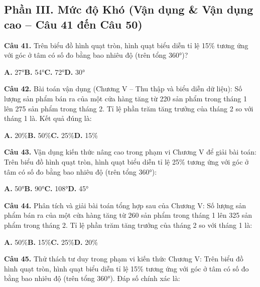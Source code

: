 \documentclass[11pt,a4paper]{article}
\begin{document}
\subsection*{\color{accent} Phần III. Mức độ Khó (Vận dụng \& Vận dụng cao -- Câu 41 đến Câu 50)}
\textbf{\color{primary} Câu 41.} Trên biểu đồ hình quạt tròn, hình quạt biểu diễn tỉ lệ 15\% tương ứng với góc ở tâm có số đo bằng bao nhiêu độ (trên tổng 360°)?\par
\hspace*{1.5em}\textbf{A.} 27°\quad\quad \textbf{B.} 54°\quad\quad \textbf{C.} 72°\quad\quad \textbf{D.} 30°\par\vspace{2pt}
\textbf{\color{primary} Câu 42.} Bài toán vận dụng (Chương V – Thu thập và biểu diễn dữ liệu): Số lượng sản phẩm bán ra của một cửa hàng tăng từ 220 sản phẩm trong tháng 1 lên 275 sản phẩm trong tháng 2. Tỉ lệ phần trăm tăng trưởng của tháng 2 so với tháng 1 là. Kết quả đúng là:\par
\hspace*{1.5em}\textbf{A.} 20\%\quad\quad \textbf{B.} 50\%\quad\quad \textbf{C.} 25\%\quad\quad \textbf{D.} 15\%\par\vspace{2pt}
\textbf{\color{primary} Câu 43.} Vận dụng kiến thức nâng cao trong phạm vi Chương V để giải bài toán: Trên biểu đồ hình quạt tròn, hình quạt biểu diễn tỉ lệ 25\% tương ứng với góc ở tâm có số đo bằng bao nhiêu độ (trên tổng 360°):\par
\hspace*{1.5em}\textbf{A.} 50°\quad\quad \textbf{B.} 90°\quad\quad \textbf{C.} 108°\quad\quad \textbf{D.} 45°\par\vspace{2pt}
\textbf{\color{primary} Câu 44.} Phân tích và giải bài toán tổng hợp sau của Chương V: Số lượng sản phẩm bán ra của một cửa hàng tăng từ 260 sản phẩm trong tháng 1 lên 325 sản phẩm trong tháng 2. Tỉ lệ phần trăm tăng trưởng của tháng 2 so với tháng 1 là:\par
\hspace*{1.5em}\textbf{A.} 50\%\quad\quad \textbf{B.} 15\%\quad\quad \textbf{C.} 25\%\quad\quad \textbf{D.} 20\%\par\vspace{2pt}
\textbf{\color{primary} Câu 45.} Thử thách tư duy trong phạm vi kiến thức Chương V: Trên biểu đồ hình quạt tròn, hình quạt biểu diễn tỉ lệ 15\% tương ứng với góc ở tâm có số đo bằng bao nhiêu độ (trên tổng 360°). Đáp số chính xác là:\par
\end{document}

